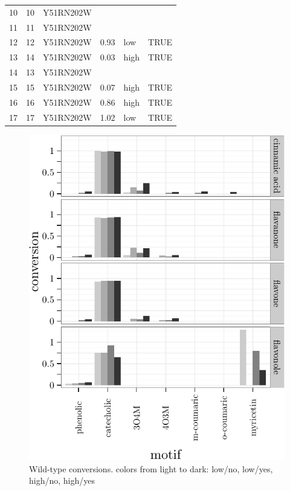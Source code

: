 \documentclass[]{tufte-handout}
\begin{document}
\begin{table}[ht]
\begin{tabular}{rllrll}
  10 & 10 & Y51RN202W &  &  &  \\ 
  11 & 11 & Y51RN202W &  &  &  \\ 
  12 & 12 & Y51RN202W & 0.93 & low & TRUE \\ 
  13 & 14 & Y51RN202W & 0.03 & high & TRUE \\ 
  14 & 13 & Y51RN202W &  &  &  \\ 
  15 & 15 & Y51RN202W & 0.07 & high & TRUE \\ 
  16 & 16 & Y51RN202W & 0.86 & high & TRUE \\ 
  17 & 17 & Y51RN202W & 1.02 & low & TRUE \\ 
   \bottomrule
\end{tabular}
\end{table}

\begin{figure}
 \includegraphics{tufte_files/figure-latex/unnamed-chunk-14-1.pdf}
\caption{Wild-type conversions. colors from light to dark: low/no, low/yes, high/no, high/yes}
\end{figure}\begin{figure}

\end{figure}
\end{document}
